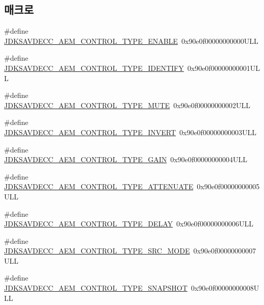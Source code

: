 \subsection*{매크로}
\begin{DoxyCompactItemize}
\item 
\#define \hyperlink{group__control__type_gae228d069642aa070781f9786e9238af3}{J\+D\+K\+S\+A\+V\+D\+E\+C\+C\+\_\+\+A\+E\+M\+\_\+\+C\+O\+N\+T\+R\+O\+L\+\_\+\+T\+Y\+P\+E\+\_\+\+E\+N\+A\+B\+LE}~0x90e0f00000000000\+U\+LL
\item 
\#define \hyperlink{group__control__type_gae5d697f1bd66d43965322aeb42d1a2de}{J\+D\+K\+S\+A\+V\+D\+E\+C\+C\+\_\+\+A\+E\+M\+\_\+\+C\+O\+N\+T\+R\+O\+L\+\_\+\+T\+Y\+P\+E\+\_\+\+I\+D\+E\+N\+T\+I\+FY}~0x90e0f00000000001\+U\+LL
\item 
\#define \hyperlink{group__control__type_ga2e0ace8151765f06f3cb84bba49ed1ab}{J\+D\+K\+S\+A\+V\+D\+E\+C\+C\+\_\+\+A\+E\+M\+\_\+\+C\+O\+N\+T\+R\+O\+L\+\_\+\+T\+Y\+P\+E\+\_\+\+M\+U\+TE}~0x90e0f00000000002\+U\+LL
\item 
\#define \hyperlink{group__control__type_ga4443caa581ccbc6d73b38e6fd3ca13d4}{J\+D\+K\+S\+A\+V\+D\+E\+C\+C\+\_\+\+A\+E\+M\+\_\+\+C\+O\+N\+T\+R\+O\+L\+\_\+\+T\+Y\+P\+E\+\_\+\+I\+N\+V\+E\+RT}~0x90e0f00000000003\+U\+LL
\item 
\#define \hyperlink{group__control__type_gac0d21e5ff84e18e51c5fad9157fa280d}{J\+D\+K\+S\+A\+V\+D\+E\+C\+C\+\_\+\+A\+E\+M\+\_\+\+C\+O\+N\+T\+R\+O\+L\+\_\+\+T\+Y\+P\+E\+\_\+\+G\+A\+IN}~0x90e0f00000000004\+U\+LL
\item 
\#define \hyperlink{group__control__type_ga2703d12a81d816671f285817951e6e6c}{J\+D\+K\+S\+A\+V\+D\+E\+C\+C\+\_\+\+A\+E\+M\+\_\+\+C\+O\+N\+T\+R\+O\+L\+\_\+\+T\+Y\+P\+E\+\_\+\+A\+T\+T\+E\+N\+U\+A\+TE}~0x90e0f00000000005\+U\+LL
\item 
\#define \hyperlink{group__control__type_ga84a96dcc22ad3256b614d214975b4261}{J\+D\+K\+S\+A\+V\+D\+E\+C\+C\+\_\+\+A\+E\+M\+\_\+\+C\+O\+N\+T\+R\+O\+L\+\_\+\+T\+Y\+P\+E\+\_\+\+D\+E\+L\+AY}~0x90e0f00000000006\+U\+LL
\item 
\#define \hyperlink{group__control__type_gaf5a7f47e5ff75d166b573da5de07831b}{J\+D\+K\+S\+A\+V\+D\+E\+C\+C\+\_\+\+A\+E\+M\+\_\+\+C\+O\+N\+T\+R\+O\+L\+\_\+\+T\+Y\+P\+E\+\_\+\+S\+R\+C\+\_\+\+M\+O\+DE}~0x90e0f00000000007\+U\+LL
\item 
\#define \hyperlink{group__control__type_ga7f9dedbd671375b432f5e52c3b411fbc}{J\+D\+K\+S\+A\+V\+D\+E\+C\+C\+\_\+\+A\+E\+M\+\_\+\+C\+O\+N\+T\+R\+O\+L\+\_\+\+T\+Y\+P\+E\+\_\+\+S\+N\+A\+P\+S\+H\+OT}~0x90e0f00000000008\+U\+LL

\end{DoxyCompactItemize}

